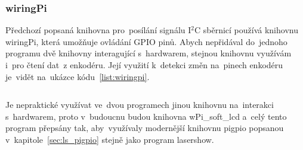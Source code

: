 \subsubsection{wiringPi}
Předchozí popsaná knihovna pro~posílání signálu I$^{2}$C sběrnicí používá knihovnu wiringPi, která umožňuje ovládání GPIO pinů. Abych nepřidával do~jednoho programu dvě knihovny interagující s~hardwarem, stejnou knihovnu využívám i~pro čtení dat~z enkodéru. Její využití k~detekci změn na~pinech enkodéru je~vidět na~ukázce kódu~\ref{list:wiringpi}.

\begin{code}
    \inputminted[frame=lines,fontsize=\footnotesize{}, linenos, breaklines]{cpp}{code_examples/wiringpi_isr.cpp}
\end{code}

Je nepraktické využívat ve~dvou programech jinou knihovnu na~interakci s~hardwarem, proto v~budoucnu budou knihovna wPi\_soft\_lcd a~celý tento program přepsány tak, aby~využívaly modernější knihovnu pigpio popsanou v~kapitole~\ref{sec:ls_pigpio} stejně jako program lasershow.


